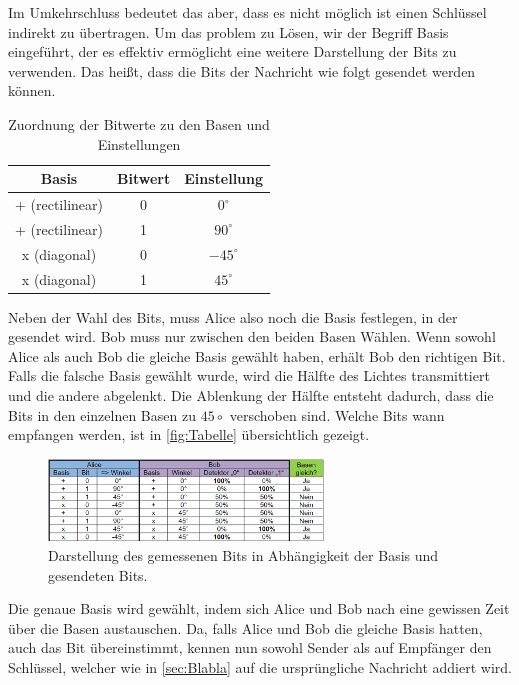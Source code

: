 Im Umkehrschluss bedeutet das aber, dass es nicht möglich ist einen Schlüssel indirekt zu übertragen.
Um das problem zu Lösen, wir der Begriff Basis eingeführt, der es effektiv ermöglicht eine weitere Darstellung der Bits zu verwenden. 
Das heißt, dass die Bits der Nachricht wie folgt gesendet werden können.
\begin{table}[H]
    \centering
    \caption{Zuordnung der Bitwerte zu den Basen und Einstellungen}
    \begin{tabular}{ccc}
    \toprule
    \textbf{Basis} & \textbf{Bitwert} & \textbf{Einstellung} \\
    \midrule
    + (rectilinear) & 0 & \(0^\circ\) \\
    + (rectilinear) & 1 & \(90^\circ\) \\
    x (diagonal)    & 0 & \(-45^\circ\) \\
    x (diagonal)    & 1 & \(45^\circ\) \\
    \bottomrule
\end{tabular}
\end{table}

Neben der Wahl des Bits, muss Alice also noch die Basis festlegen, in der gesendet wird.
Bob muss nur zwischen den beiden Basen Wählen.
Wenn sowohl Alice als auch Bob die gleiche Basis gewählt haben, erhält Bob den richtigen Bit. Falls die falsche Basis gewählt wurde, wird die Hälfte des Lichtes transmittiert und die andere abgelenkt. Die Ablenkung der Hälfte entsteht dadurch, dass die Bits in den einzelnen Basen zu $45\circ$ verschoben sind.
Welche Bits wann empfangen werden, ist in \autoref{fig:Tabelle} übersichtlich gezeigt.

\begin{figure}[H]
	\centering
	\includegraphics[width=0.65\textwidth]{content/grafik/Tabelle.png}
	\caption{Darstellung des gemessenen Bits in Abhängigkeit der Basis und gesendeten Bits. \cite{krypt}}
	\label{fig:Tabelle}
\end{figure}
Die genaue Basis wird gewählt, indem sich Alice und Bob nach eine gewissen Zeit über die Basen austauschen. Da, falls Alice und Bob die gleiche Basis hatten, auch das Bit übereinstimmt, kennen nun sowohl Sender als auf Empfänger den Schlüssel, welcher wie in \autoref{sec:Blabla} auf die ursprüngliche Nachricht addiert wird.
      
